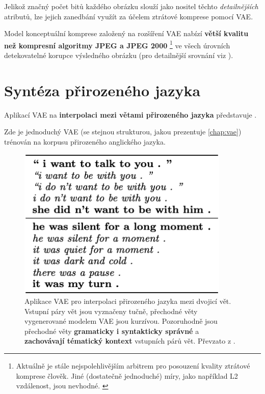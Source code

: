 Jelikož značný počet bitů každého obrázku slouží jako nositel těchto \emph{detailnějších} atributů, lze jejich zanedbání využít za účelem ztrátové komprese pomocí VAE.

Model konceptuální komprese založený na rozšíření VAE nabízí \textbf{větší kvalitu než kompresní algoritmy JPEG a JPEG 2000}
\footnote{Aktuálně je stále nejspolehlivějším arbitrem pro posouzení kvality ztrátové komprese člověk. Jiné (dostatečně jednoduché) míry, jako například L2 vzdálenost, jsou nevhodné. \cite{Gregor2016}} ve všech úrovních detekovatelné korupce výsledného obrázku (pro detailnější srovnání viz \textcite{Gregor2016}).

\newpage
\section{Syntéza přirozeného jazyka}
\label{sec:applications_language_synthesis}
Aplikací VAE na \textbf{interpolaci mezi větami přirozeného jazyka} představuje \textcite{Bowman2016}.

Zde je jednoduchý VAE (se stejnou strukturou, jakou prezentuje \autoref{chap:vae}) trénován na korpusu přirozeného anglického jazyka.

\begin{figure}[H]
    \centering
    \includegraphics[width=0.9\textwidth]{figures/applications/vae_sentence_interpolation_bowman.png}
    \caption{Aplikace VAE pro interpolaci přirozeného jazyka mezi dvojicí vět. Vstupní páry vět jsou vyznačeny tučně, přechodné věty vygenerované modelem VAE jsou kurzívou.
    Pozoruhodně jsou přechodné věty \textbf{gramaticky i syntakticky správné} a \textbf{zachovávají tématický kontext} vstupních párů vět. Převzato z \textcite{Bowman2016}.}
    \label{fig:vae_sentence_interpolation_bowman}
\end{figure}


